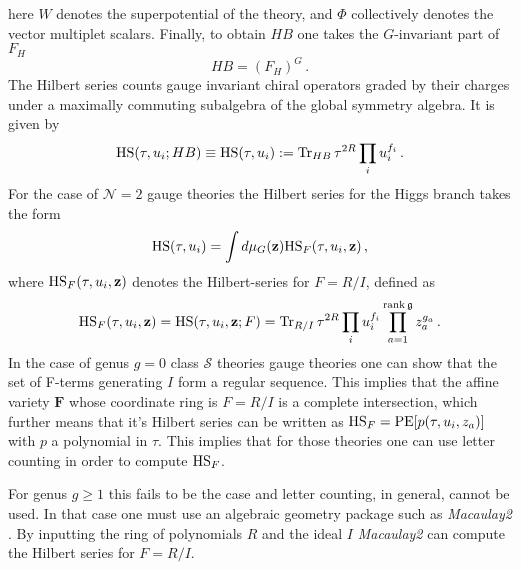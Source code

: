 \documentclass[main.tex]{subfiles}
\begin{document}
here $W$ denotes the superpotential of the theory, and $\Phi$ collectively denotes the vector multiplet scalars. Finally, to obtain $HB$ one takes the $G$-invariant part of $F_H$
\begin{equation}
HB=(F_H)^{G}\,.
\end{equation}
The Hilbert series counts gauge invariant chiral operators graded by their charges under a maximally commuting subalgebra of the global symmetry algebra. It is given by
\begin{equation}
\textrm{HS}(\tau,u_i;HB)\equiv \textrm{HS}(\tau,u_i): = \operatorname{Tr}_{HB}\tau^{2R}\prod_iu_i^{f_i}\,.
\end{equation}
For the case of $\mathcal{N}=2$ gauge theories the Hilbert series for the Higgs branch takes the form
\begin{equation}
\textrm{HS}(\tau,u_i)=\int d\mu_{G}(\mathbf{z})\textrm{HS}_F(\tau,u_i,\mathbf{z})\,,
\end{equation}
where $\textrm{HS}_F(\tau,u_i,\mathbf{z})$ denotes the Hilbert-series for $F=R/I$, defined as
\begin{equation}
\textrm{HS}_F(\tau,u_i,\mathbf{z})=\textrm{HS}(\tau,u_i,\mathbf{z};F)=\operatorname{Tr}_{R/I}\tau^{2R}\prod_iu_i^{f_i}\prod_{a=1}^{\operatorname{rank}\mathfrak{g}}z_a^{g_a}\,.
\end{equation}
In the case of genus $g=0$ class $\mathcal{S}$ theories gauge theories one can show that the set of F-terms generating $I$ form a regular sequence. 
This implies that the affine variety $\mathbf{F}$  whose coordinate ring is $F=R/I$ is a complete intersection, which further means that it's Hilbert series can be written as $\textrm{HS}_F=\operatorname{\mathrm{PE}}[p(\tau,u_i,z_a)]$ with $p$ a polynomial in $\tau$.
This implies that for those theories one can use letter counting in order to compute $\textrm{HS}_F$.

For genus $g\geq1$ this fails to be the case and letter counting, in general, cannot be used. In that case one must use an algebraic geometry package such as \textit{Macaulay2} \cite{M2}. By inputting the ring of polynomials $R$ and the ideal $I$ \textit{Macaulay2} can compute the Hilbert series for $F=R/I$. 
\end{document}

